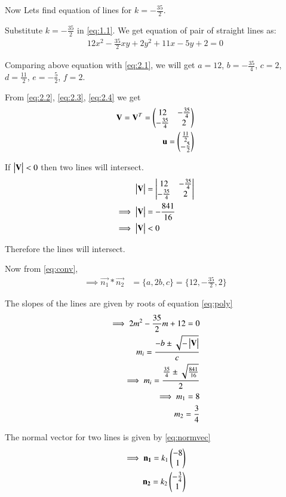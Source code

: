 \documentclass[journal,12pt,twocolumn]{IEEEtran}
\begin{document}
Now Lets find equation of lines for $k=-\frac{35}{2}$.

Substitute $k=-\frac{35}{2}$ in \eqref{eq:1.1}. We get equation of pair of straight lines as:
\begin{align}
    12x^2-\frac{35}{2}xy+2y^2+11x-5y+2=0
\end{align}

Comparing above equation with \eqref{eq:2.1}, we will get $a=12$, $b=-\frac{35}{4}$, $c=2$, $d=\frac{11}{2}$, $e=-\frac{5}{2}$, $f=2$.

From \eqref{eq:2.2}, \eqref{eq:2.3}, \eqref{eq:2.4} we get
\begin{align}
    \mathbf{V}=\mathbf{V}^T=\begin{pmatrix}12 & -\frac{35}{4} \\ -\frac{35}{4} & 2\end{pmatrix}\label{eq:2.48}\\
    \mathbf{u}=\begin{pmatrix}\frac{11}{2} \\ -\frac{5}{2}\end{pmatrix}\label{eq:2.49}
\end{align}

If $\begin{vmatrix}\mathbf{V}\end{vmatrix}<0$ then two lines will intersect.
\begin{align}
    \begin{vmatrix}\mathbf{V}\end{vmatrix}&=\begin{vmatrix}12 & -\frac{35}{4} \\ -\frac{35}{4} & 2\end{vmatrix}\\
    \implies\begin{vmatrix}\mathbf{V}\end{vmatrix}&=-\frac{841}{16}\\
    \implies\begin{vmatrix}\mathbf{V}\end{vmatrix}&<0
\end{align}

Therefore the lines will intersect.

Now from \eqref{eq:conv},
\begin{align}
    \implies\vec{n_1}*\vec{n_2}&=\{a,2b,c\}=\{12,-\frac{35}{2},2\}\label{eq:conv2}
\end{align}

The slopes of the lines are given by roots of equation \eqref{eq:poly}
\begin{align}
    \implies 2m^2-\frac{35}{2}m+12=0\\
    m_i=\frac{-b\pm{\sqrt{-\ensuremath{\begin{vmatrix}\mathbf{V}\end{vmatrix}}}}}{c}\\
    \implies m_i=\frac{\frac{35}{4}\pm{\sqrt{\frac{841}{16}}}}{2}\\
    \implies m_1=8\\
     m_2=\frac{3}{4}
\end{align}

The normal vector for two lines is given by \eqref{eq:normvec}
\begin{align}
    \implies\mathbf{n_1}=k_1\begin{pmatrix}-8\\1\end{pmatrix}\label{eq:n3}\\
    \mathbf{n_2}=k_2\begin{pmatrix}-\frac{3}{4}\\1\end{pmatrix}\label{eq:n4}
\end{align}
\end{document}
